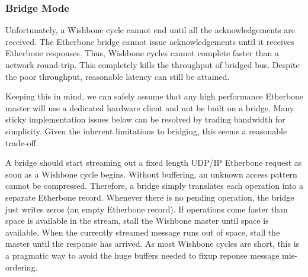 \documentclass{article}
\begin{document}
\subsubsection{Bridge Mode}
\label{sec:bridge}

Unfortunately, 
a Wishbone cycle cannot end until all the acknowledgements are received.
The Etherbone bridge cannot issue acknowledgements until 
it receives Etherbone responses.
Thus, Wishbone cycles cannot complete faster than a network round-trip.
This completely kills the throughput of bridged bus.
Despite the poor throughput, 
reasonable latency can still be attained.

Keeping this in mind,
we can safely assume that any high performance Etherbone master will use 
a dedicated hardware client and not be built on a bridge.
Many sticky implementation issues below can be resolved by 
trading bandwidth for simplicity.
Given the inherent limitations to bridging,
this seems a reasonable trade-off.

A bridge should start streaming out a fixed length UDP/IP Etherbone 
request as soon as a Wishbone cycle begins.
Without buffering,
an unknown access pattern cannot be compressed.
Therefore, 
a bridge simply translates each operation into a separate Etherbone record.
Whenever there is no pending operation,
the bridge just writes zeros (an empty Etherbone record).
If operations come faster than space is available in the stream,
stall the Wishbone master until space is available.
When the currently streamed message runs out of space,
stall the master until the response has arrived.
As most Wishbone cycles are short,
this is a pragmatic way to avoid the huge buffers needed to 
fixup reponse message mis-ordering.
\end{document}
